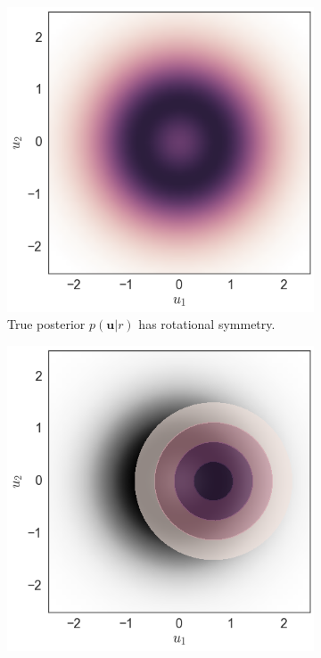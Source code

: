 \documentclass{article}
\renewcommand{\v}[1]{\mathbf{#1}}
\begin{document}
\begin{figure}[t]
\centering
\begin{subfigure}[t]{.3\textwidth}
\includegraphics[width=\textwidth]{rot_bayes_posterior}
\caption{True posterior $p(\v{u} | r)$ has rotational symmetry.}
\end{subfigure}
\begin{subfigure}[t]{.3\textwidth}
\includegraphics[width=\textwidth]{rot_mfvb_posterior}

\end{subfigure}
\end{figure}
\end{document}

